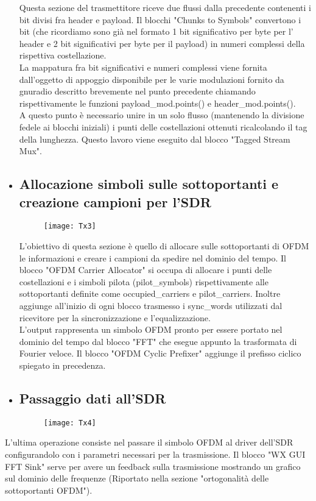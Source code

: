 \begin{itemize}
 Questa sezione del trasmettitore riceve due flussi dalla precedente contenenti i bit divisi fra header e payload. Il blocchi "Chunks to Symbols" convertono i bit (che ricordiamo sono già nel formato 1 bit significativo per byte per l' header e 2 bit significativi per byte per il payload) in numeri complessi della rispettiva costellazione.\\ La mappatura fra bit significativi e numeri complessi viene fornita dall'oggetto di appoggio disponibile per le varie modulazioni fornito da gnuradio descritto brevemente nel punto precedente chiamando rispettivamente le funzioni payload\_mod.points() e header\_mod.points().\\ A questo punto è necessario unire in un solo flusso (mantenendo la divisione fedele ai blocchi iniziali) i punti delle costellazioni ottenuti ricalcolando il tag della lunghezza. Questo lavoro viene eseguito dal blocco "Tagged Stream Mux".
 	\item \subsection{Allocazione simboli sulle sottoportanti e creazione campioni per l'SDR}
 	\begin{figure}[h]
 		\raggedleft
 		\texttt{[image: Tx3]}
 		\caption{}
 	\end{figure}
 L'obiettivo di questa sezione è quello di allocare sulle sottoportanti di OFDM le informazioni e creare i campioni da spedire nel dominio del tempo. Il blocco "OFDM Carrier Allocator" si occupa di allocare i punti delle costellazioni e i simboli pilota (pilot\_symbols) rispettivamente alle sottoportanti definite come occupied\_carriers e pilot\_carriers. Inoltre aggiunge all'inizio di ogni blocco trasmesso i sync\_words utilizzati dal ricevitore per la sincronizzazione e l'equalizzazione. \\L'output rappresenta un simbolo OFDM pronto per essere portato nel dominio del tempo dal blocco  "FFT" che esegue appunto la trasformata di Fourier veloce. Il blocco "OFDM Cyclic Prefixer" aggiunge il prefisso ciclico spiegato in precedenza.
 \newpage
 	\item \subsection{Passaggio dati all'SDR}
 	\begin{figure}[h]
 		\centering
 		\texttt{[image: Tx4]}
 		\caption{}
 	\end{figure}
 \end{itemize}
L'ultima operazione consiste nel passare il simbolo OFDM al driver dell'SDR configurandolo con i parametri necessari per la trasmissione. Il blocco "WX GUI FFT Sink" serve per avere un feedback sulla trasmissione mostrando un grafico sul dominio delle frequenze (Riportato nella sezione "ortogonalità delle sottoportanti OFDM").
